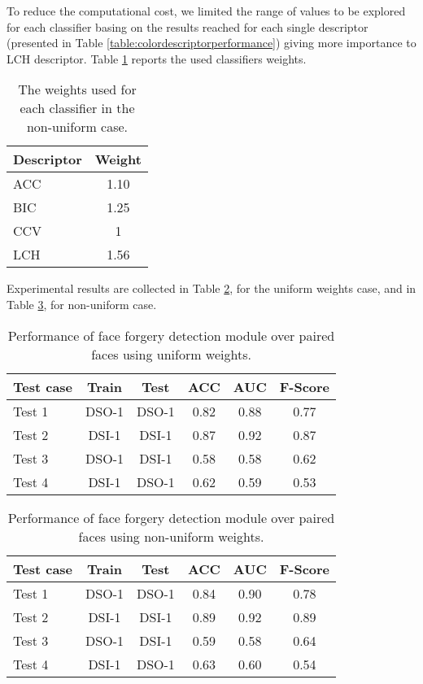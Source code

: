 To reduce the computational cost, we limited the range of values to be explored for each classifier basing on the results reached for each single descriptor (presented in Table \ref{table:colordescriptorperformance}) giving more importance to LCH descriptor. Table \ref{table:classifiersweights} reports the used classifiers weights.

\begin{table}[h!]
\centering
\begin{tabular}{l c} 
\hline \hline 
\textbf{Descriptor} & \textbf{Weight}\\ [0.5ex]
\hline
ACC & 1.10\\
BIC & 1.25\\
CCV & 1\\
LCH & 1.56\\ [1ex]
\hline
\end{tabular}
\caption{The weights used for each classifier in the non-uniform case.}
\label{table:classifiersweights}
\end{table}

Experimental results are collected in Table \ref{table:performancefacedet}, for the uniform weights case, and in Table \ref{table:performancefacedetnonun}, for non-uniform case. 

\begin{table}[h!]
\centering
\begin{tabular}{l c c c c c} 
\hline \hline 
\textbf{Test case} & \textbf{Train} & \textbf{Test} & \textbf{ACC} & \textbf{AUC} &\textbf{ F-Score} \\ [0.5ex]
\hline
Test 1 & DSO-1 & DSO-1 &	0.82 & 0.88	& 0.77\\
Test 2 & DSI-1 & DSI-1 &	0.87 & 0.92 & 0.87\\
Test 3 &	DSO-1 &	DSI-1 &	0.58 & 0.58 & 0.62\\
Test 4 &	DSI-1 & DSO-1 & 0.62 & 0.59 & 0.53\\ [1ex]
\hline
\end{tabular}
\caption{Performance of face forgery detection module over paired faces using uniform weights.}
\label{table:performancefacedet}
\end{table}

\begin{table}[h!]
\centering
\begin{tabular}{l c c c c c} 
\hline \hline 
\textbf{Test case} & \textbf{Train} & \textbf{Test} & \textbf{ACC} & \textbf{AUC} &\textbf{ F-Score} \\ [0.5ex]
\hline
Test 1 & DSO-1 & DSO-1 &	0.84 & 0.90	& 0.78\\
Test 2 & DSI-1 & DSI-1 &	0.89 & 0.92 & 0.89\\
Test 3 &	DSO-1 &	DSI-1 &	0.59 & 0.58 & 0.64\\
Test 4 &	DSI-1 & DSO-1 & 0.63 & 0.60 & 0.54\\ [1ex]
\hline
\end{tabular}
\caption{Performance of face forgery detection module over paired faces using non-uniform weights.}
\label{table:performancefacedetnonun}
\end{table}

